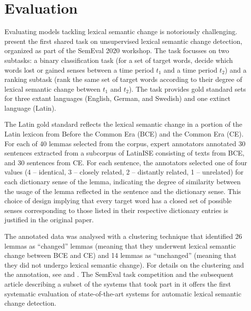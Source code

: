 \documentclass[output=paper%
]{langscibook}
\begin{document}
\section{Evaluation}\largerpage
\label{sec:evaluation}
Evaluating models tackling lexical semantic change is notoriously challenging. 
\citet{schlechtweg-etal-2020-semeval} present the first shared task on unsupervised lexical semantic change detection, organized as part of the SemEval 2020 workshop. The task focusses on two subtasks:  a binary classification task (for a set of target words, decide which words lost or gained senses
between a time period $t_{1}$ and a time period $t_{2}$) and a ranking subtask (rank the same set of target words according to their degree of lexical semantic change between $t_{1}$ and $t_{2}$).
The task provides gold standard sets for three extant languages (English, German, and Swedish) and one extinct language (Latin).

The Latin gold standard reflects the lexical semantic change in a portion of the Latin lexicon from Before the Common Era (BCE) and the Common Era (CE). For each of 40 lemmas selected from the corpus, expert annotators annotated 30 sentences extracted from a subcorpus of LatinISE consisting of texts from BCE, and 30 sentences from CE. For each sentence, the annotators selected one of four values (4 -- identical, 3 -- closely related, 2 -- distantly related, 1 -- unrelated) for each dictionary sense of the lemma, indicating the degree of similarity between the usage of the lemma reflected in the sentence and the dictionary sense. This choice of design implying that every target word has a closed set of possible senses corresponding to those listed in their respective dictionary entries is justified in the original paper.

The annotated data was analysed with a clustering technique that identified 26 lemmas as ``changed'' lemmas (meaning that they underwent lexical semantic change between BCE and CE) and 14 lemmas as ``unchanged'' (meaning that they did not undergo lexical semantic change). For details on the clustering and the annotation, see \citet{schlechtweg-etal-2020-semeval} and \citet{schlechtweg2021dwug}. The SemEval task competition and the subsequent article describing a subset of the systems that took part in it offers the first systematic evaluation of state-of-the-art systems for automatic lexical semantic change detection. 


\end{document}
